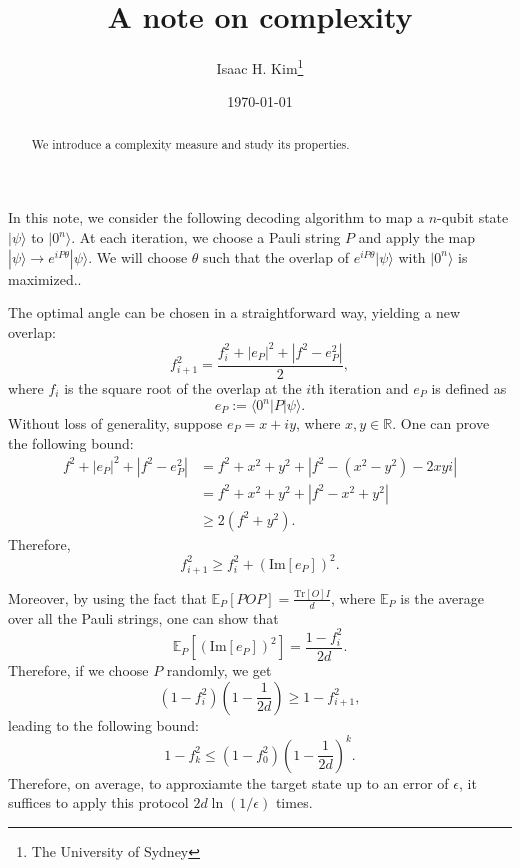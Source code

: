 \documentclass[11pt]{article}
\begin{document}
\title{A note on complexity}

\author{\normalsize Isaac H. Kim\thanks{The University of Sydney}}

\date{\today} 
\maketitle
\begin{abstract}
  We introduce a complexity measure and study its properties.
\end{abstract}                             

In this note, we consider the following decoding algorithm to map a $n$-qubit state $|\psi\rangle$ to $|0^n\rangle$. At each iteration, we choose a Pauli string $P$ and apply the map $|\psi\rangle \to e^{iP\theta}|\psi\rangle$. We will choose $\theta$ such that the overlap of $e^{iP\theta}|\psi\rangle$ with $|0^{n}\rangle$ is maximized..

The optimal angle can be chosen in a straightforward way, yielding a new overlap:
\begin{equation}
  f_{i+1}^2 = \frac{f_i^2 + |e_P|^2 + |f^2 - e_P^2|}{2},
\end{equation}
where $f_i$ is the square root of the overlap at the $i$th iteration and $e_P$ is defined as
\begin{equation}
  e_P := \langle 0^n| P|\psi\rangle.
\end{equation}
Without loss of generality, suppose $e_P =x+ iy$, where $x,y\in \mathbb{R}$. One can prove the following bound:
\begin{equation}
  \begin{aligned}
    f^2 + |e_P|^2 + |f^2-e_P^2| &= f^2 + x^2 + y^2 + |f^2 - (x^2-y^2)-2xyi| \\
    &= f^2 + x^2 + y^2 + |f^2 - x^2 + y^2| \\
    &\geq 2(f^2 + y^2).
  \end{aligned}
  \label{eq:inequalities}
 \end{equation}
 Therefore,
 \begin{equation}
   f_{i+1}^2 \geq f_{i}^2 + (\text{Im}[e_P])^2.
 \end{equation}

 Moreover, by using the fact that $\mathbb{E}_P[P O P] = \frac{\text{Tr}[O] I}{d}$, where $\mathbb{E}_P$ is the average over all the Pauli strings, one can show that
 \begin{equation}
   \mathbb{E}_P [(\text{Im}[e_P])^2]  = \frac{1-f_{i}^2}{2d}.
 \end{equation}
 Therefore, if we choose $P$ randomly, we get
 \begin{equation}
   (1-f_i^2)\left(1-\frac{1}{2d}\right) \geq 1-f_{i+1}^2,
 \end{equation}
 leading to the following bound:
 \begin{equation}
   1-f_k^2 \leq (1-f_0^2)\left(1-\frac{1}{2d} \right)^k. \label{eq:infidelity_decay}
 \end{equation}
Therefore, on average, to approxiamte the target state up to an error of $\epsilon$, it suffices to apply this protocol $2d\ln(1/\epsilon)$ times.
\end{document}
